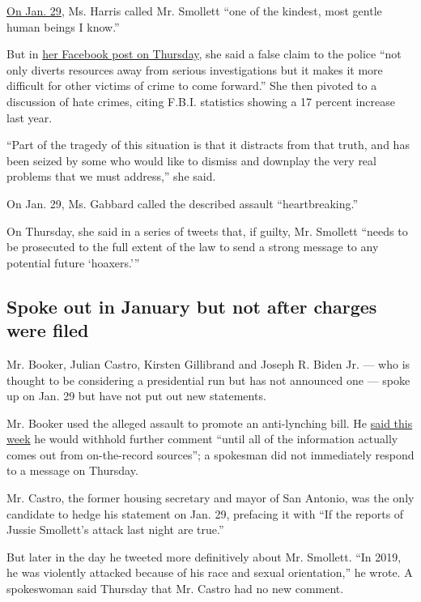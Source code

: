 \href{https://twitter.com/KamalaHarris/status/1090361495119187969}{On
Jan. 29}, Ms. Harris called Mr. Smollett ``one of the kindest, most
gentle human beings I know.''

But in
\href{https://www.facebookcorewwwi.onion/KamalaHarris/posts/10157494880507923}{her
Facebook post on Thursday}, she said a false claim to the police ``not
only diverts resources away from serious investigations but it makes it
more difficult for other victims of crime to come forward.'' She then
pivoted to a discussion of hate crimes, citing F.B.I. statistics showing
a 17 percent increase last year.

``Part of the tragedy of this situation is that it distracts from that
truth, and has been seized by some who would like to dismiss and
downplay the very real problems that we must address,'' she said.

On Jan. 29, Ms. Gabbard called the described assault ``heartbreaking.''

On Thursday, she said in a series of tweets that, if guilty, Mr.
Smollett ``needs to be prosecuted to the full extent of the law to send
a strong message to any potential future `hoaxers.'''

\hypertarget{spoke-out-in-january-but-not-after-charges-were-filed}{%
\subsection{Spoke out in January but not after charges were
filed}\label{spoke-out-in-january-but-not-after-charges-were-filed}}

Mr. Booker, Julian Castro, Kirsten Gillibrand and Joseph R. Biden Jr.
--- who is thought to be considering a presidential run but has not
announced one --- spoke up on Jan. 29 but have not put out new
statements.

Mr. Booker used the alleged assault to promote an anti-lynching bill. He
\href{https://www.youtube.com/watch?v=tIsU4uyGyKE}{said this week} he
would withhold further comment ``until all of the information actually
comes out from on-the-record sources''; a spokesman did not immediately
respond to a message on Thursday.

Mr. Castro, the former housing secretary and mayor of San Antonio, was
the only candidate to hedge his statement on Jan. 29, prefacing it with
``If the reports of Jussie Smollett's attack last night are true.''

But later in the day he tweeted more definitively about Mr. Smollett.
``In 2019, he was violently attacked because of his race and sexual
orientation,'' he wrote. A spokeswoman said Thursday that Mr. Castro had
no new comment.

